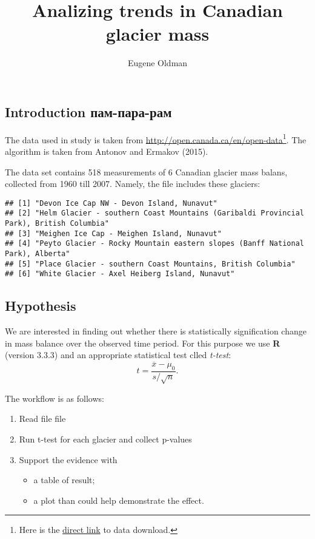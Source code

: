 \documentclass[]{article}
\title{Analizing trends in Canadian glacier mass}
\author{Eugene Oldman}
\date{}
\providecommand{\tightlist}{%
  \setlength{\itemsep}{0pt}\setlength{\parskip}{0pt}}
\let\rmarkdownfootnote\footnote%
\def\footnote{\protect\rmarkdownfootnote}
\begin{document}
\maketitle

\subsection{Introduction пам-пара-рам}\label{introduction---}

The data used in study is taken from
\url{http://open.canada.ca/en/open-data}\footnote{Here is the
  \href{http://www20.statcan.gc.ca/tables-tableaux/cansim/csv/01530102-eng.zip}{direct
  link} to data download.}. The algorithm is taken from Antonov and
Ermakov (2015).

The data set contains 518 measurements of 6 Canadian glacier mass
balans, collected from 1960 till 2007. Namely, the file includes these
glaciers:

\begin{verbatim}
## [1] "Devon Ice Cap NW - Devon Island, Nunavut"                                             
## [2] "Helm Glacier - southern Coast Mountains (Garibaldi Provincial Park), British Columbia"
## [3] "Meighen Ice Cap - Meighen Island, Nunavut"                                            
## [4] "Peyto Glacier - Rocky Mountain eastern slopes (Banff National Park), Alberta"         
## [5] "Place Glacier - southern Coast Mountains, British Columbia"                           
## [6] "White Glacier - Axel Heiberg Island, Nunavut"
\end{verbatim}

\subsection{Hypothesis}\label{hypothesis}

We are interested in finding out whether there is statistically
signification change in mass balance over the observed time period. For
this purpose we use \textbf{R} (version 3.3.3) and an appropriate
statistical test clled \emph{t-test}:
\[ t = \frac{\overline{x} - \mu_0}{s/\sqrt{n}}.\]

The workflow is as follows:

\begin{enumerate}
\def\labelenumi{\arabic{enumi}.}
\tightlist
\item
  Read file file
\item
  Run t-test for each glacier and collect p-values
\item
  Support the evidence with

  \begin{itemize}
  \tightlist
  \item
    a table of result;
  \item
    a plot than could help demonstrate the effect.
  \end{itemize}
\end{enumerate}
\end{document}
